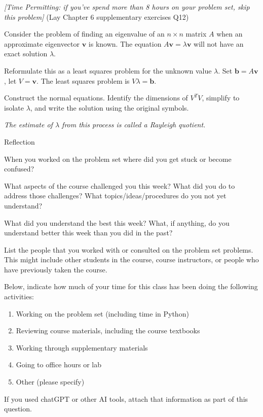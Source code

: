 \documentclass[12pt,letterpaper,noanswers]{exam}
\newcommand{\mathbf}[1]{\boldsymbol{#1}}
\begin{document}
\begin{questions}
\question \emph{[Time Permitting: if you've spend more than 8 hours on your problem set, skip this problem]} (Lay Chapter 6 supplementary exercises Q12)

Consider the problem of finding an eigenvalue of an $n\times n$ matrix $A$ when an approximate eigenvector $\mathbf{v}$ is known.  The equation $A\mathbf{v} = \lambda\mathbf{v}$ will not have an exact solution $\lambda$.

Reformulate this as a least squares problem for the unknown value $\lambda$.  Set $\mathbf{b} = A\mathbf{v}$, let $V = \mathbf{v}$.  The least squares problem is $V\lambda = \mathbf{b}$.

    Construct the normal equations.  Identify the dimensions of $V^TV$, simplify to isolate $\lambda$, and write the solution using the original symbols.

    \emph{The estimate of $\lambda$ from this process is called a Rayleigh quotient.}


\question Reflection
\begin{parts}
\item When you worked on the problem set where did you get stuck or become confused?
\item What aspects of the course challenged you this week?  What did you do to address those challenges?  What topics/ideas/procedures do you not yet understand?
\item What did you understand the best this week?  What, if anything, do you understand better this week than you did in the past?
\item List the people that you worked with or consulted on the problem set problems.  This might include other students in the course, course instructors, or people who have previously taken the course.
\item Below, indicate how much of your time for this class has been doing the following activities:
	\begin{enumerate}
	\item Working on the problem set (including time in Python)
	\item Reviewing course materials, including the course textbooks
	\item Working through supplementary materials
	\item Going to office hours or lab
	\item Other (please specify)
	\end{enumerate}
\item If you used chatGPT or other AI tools, attach that information as part of this question.
\end{parts}


\end{questions}





% 
% 
\end{document}
